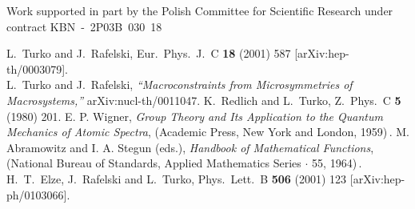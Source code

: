 \documentclass[a4paper,aps]{revtex4}
\begin{document}
\begin{acknowledgments}
Work supported in part by the Polish Committee for Scientific
Research under contract KBN~-~2P03B~030~18
\end{acknowledgments}

\begin{thebibliography}{99}
L.~Turko and J.~Rafelski,
Eur.\ Phys.\ J.\ C {\bf 18} (2001) 587 [arXiv:hep-th/0003079].\\
L.~Turko and J.~Rafelski, \textit{``Macroconstraints from
Microsymmetries of Macrosystems,''} arXiv:nucl-th/0011047.
K.~Redlich and L.~Turko,
Z.\ Phys.\ C {\bf 5} (1980) 201.
E. P. Wigner, {\it Group Theory and Its Application to the Quantum
Mechanics of Atomic Spectra}, (Academic Press, New York and
London, 1959)\,.
 M. Abramowitz and I. A. Stegun (eds.), {\it Handbook of
Mathematical Functions}, (National Bureau of Standards, Applied
Mathematics Series $\cdot$  55, 1964)\,.
H.~T.~Elze, J.~Rafelski and L.~Turko,
Phys.\ Lett.\ B {\bf 506} (2001) 123 [arXiv:hep-ph/0103066].


\end{thebibliography}
\end{document}
